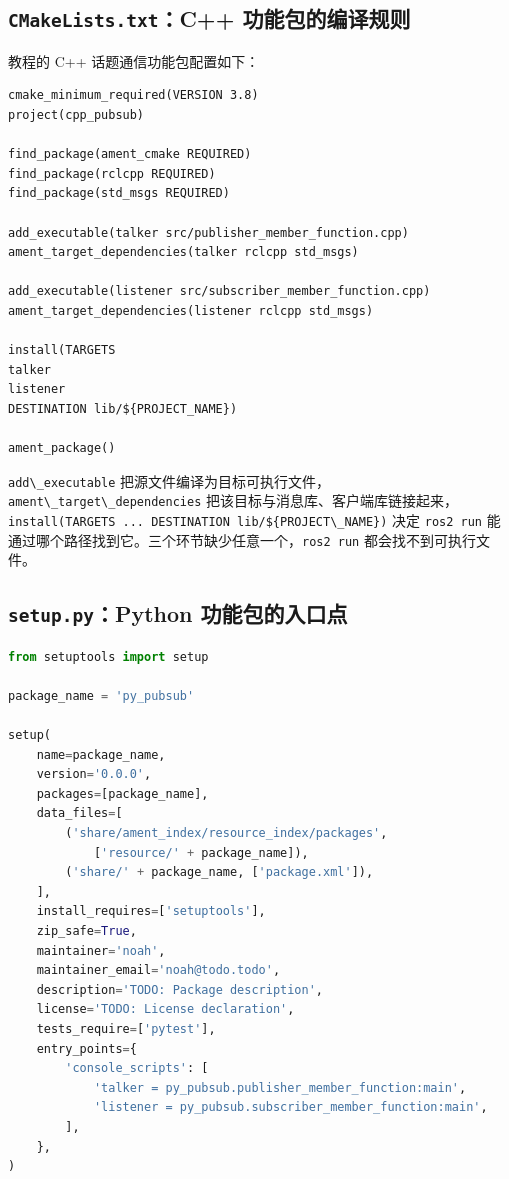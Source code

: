 \subsection{\texorpdfstring{\texttt{CMakeLists.txt}：C++
功能包的编译规则}{CMakeLists.txt：C++ 功能包的编译规则}}\label{cmakelists.txtc-ux529fux80fdux5305ux7684ux7f16ux8bd1ux89c4ux5219}

教程的 C++ 话题通信功能包配置如下：

\begin{lstlisting}
cmake_minimum_required(VERSION 3.8)
project(cpp_pubsub)

find_package(ament_cmake REQUIRED)
find_package(rclcpp REQUIRED)
find_package(std_msgs REQUIRED)

add_executable(talker src/publisher_member_function.cpp)
ament_target_dependencies(talker rclcpp std_msgs)

add_executable(listener src/subscriber_member_function.cpp)
ament_target_dependencies(listener rclcpp std_msgs)

install(TARGETS
talker
listener
DESTINATION lib/${PROJECT_NAME})

ament_package()
\end{lstlisting}

\passthrough{\lstinline!add\_executable!}
把源文件编译为目标可执行文件，\passthrough{\lstinline!ament\_target\_dependencies!}
把该目标与消息库、客户端库链接起来，\passthrough{\lstinline!install(TARGETS ... DESTINATION lib/$\{PROJECT\_NAME\})!}
决定 \passthrough{\lstinline!ros2 run!}
能通过哪个路径找到它。三个环节缺少任意一个，\passthrough{\lstinline!ros2 run!}
都会找不到可执行文件。

\subsection{\texorpdfstring{\texttt{setup.py}：Python
功能包的入口点}{setup.py：Python 功能包的入口点}}\label{setup.pypython-ux529fux80fdux5305ux7684ux5165ux53e3ux70b9}

\begin{lstlisting}[language=Python]
from setuptools import setup

package_name = 'py_pubsub'

setup(
    name=package_name,
    version='0.0.0',
    packages=[package_name],
    data_files=[
        ('share/ament_index/resource_index/packages',
            ['resource/' + package_name]),
        ('share/' + package_name, ['package.xml']),
    ],
    install_requires=['setuptools'],
    zip_safe=True,
    maintainer='noah',
    maintainer_email='noah@todo.todo',
    description='TODO: Package description',
    license='TODO: License declaration',
    tests_require=['pytest'],
    entry_points={
        'console_scripts': [
            'talker = py_pubsub.publisher_member_function:main',
            'listener = py_pubsub.subscriber_member_function:main',
        ],
    },
)
\end{lstlisting}

